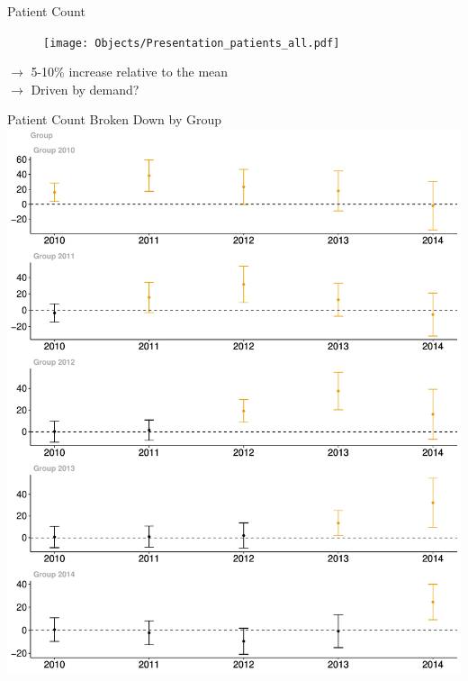 \documentclass[10pt]{beamer}
\begin{document}
\begin{frame}{Patient Count}
\begin{figure}[ht]
    \centering
    \texttt{[image: Objects/Presentation\_patients\_all.pdf]}
\end{figure}
$\rightarrow$ 5-10\% increase relative to the mean\\
$\rightarrow$ Driven by demand? 
\end{frame}

\begin{frame}{Patient Count Broken Down by Group}
\centering
    \includegraphics[scale=.25]{Objects/patient_group.pdf}
\end{frame}
\end{document}
